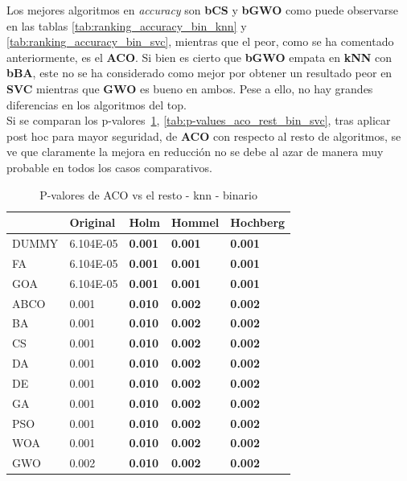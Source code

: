 Los mejores algoritmos en \textit{accuracy} son \textbf{bCS} y \textbf{bGWO} como puede observarse en las tablas \ref{tab:ranking_accuracy_bin_knn} y \ref{tab:ranking_accuracy_bin_svc}, mientras que el peor, como se ha comentado anteriormente, es el \textbf{ACO}. Si bien es cierto que \textbf{bGWO} empata en \textbf{kNN} con \textbf{bBA}, este no se ha considerado como mejor por obtener un resultado peor en \textbf{SVC} mientras que \textbf{GWO} es bueno en ambos. Pese a ello, no hay grandes diferencias en los algoritmos del top.\\[6pt]

Si se comparan los p-valores~\ref{tab:p-values_aco_rest_bin_knn}, \ref{tab:p-values_aco_rest_bin_svc}, tras aplicar post hoc para mayor seguridad, de \textbf{ACO} con respecto al resto de algoritmos, se ve que claramente la mejora en reducción no se debe al azar de manera muy probable en todos los casos comparativos.

\begin{table}[htp]
    \centering
    \begin{tabular}{lllll}
        \toprule
        {}    & Original  & Holm           & Hommel         & Hochberg       \\
        \midrule
        DUMMY & 6.104E-05 & \textbf{0.001} & \textbf{0.001} & \textbf{0.001} \\
        FA    & 6.104E-05 & \textbf{0.001} & \textbf{0.001} & \textbf{0.001} \\
        GOA   & 6.104E-05 & \textbf{0.001} & \textbf{0.001} & \textbf{0.001} \\
        ABCO  & 0.001     & \textbf{0.010} & \textbf{0.002} & \textbf{0.002} \\
        BA    & 0.001     & \textbf{0.010} & \textbf{0.002} & \textbf{0.002} \\
        CS    & 0.001     & \textbf{0.010} & \textbf{0.002} & \textbf{0.002} \\
        DA    & 0.001     & \textbf{0.010} & \textbf{0.002} & \textbf{0.002} \\
        DE    & 0.001     & \textbf{0.010} & \textbf{0.002} & \textbf{0.002} \\
        GA    & 0.001     & \textbf{0.010} & \textbf{0.002} & \textbf{0.002} \\
        PSO   & 0.001     & \textbf{0.010} & \textbf{0.002} & \textbf{0.002} \\
        WOA   & 0.001     & \textbf{0.010} & \textbf{0.002} & \textbf{0.002} \\
        GWO   & 0.002     & \textbf{0.010} & \textbf{0.002} & \textbf{0.002} \\
        \bottomrule
    \end{tabular}
    \caption{P-valores de ACO vs el resto - knn - binario}
    \label{tab:p-values_aco_rest_bin_knn}
\end{table}

